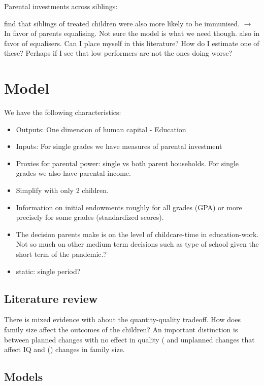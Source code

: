 \documentclass[11pt,a4paper,twoside]{article}
\begin{document}
Parental investments across siblings:

\cite{adhvaryu_endowments_2016} find that siblings of treated children were also more likely to be immunised. $\rightarrow$ In favor of parents equalising. Not sure the model is what we need though. \cite{yi_early_2015} also in favor of equalisers. Can I place myself in this literature? How do I estimate one of these? Perhaps if I see that low performers are not the ones doing worse?

\section{Model}

We have the following characteristics:

\begin{itemize}
    \item Outputs: One dimension of human capital - Education
    \item Inputs: For single grades we have measures of parental investment
    \item Proxies for parental power: single vs both parent households. For single grades we also have parental income.
    \item Simplify with only 2 children.
    \item Information on initial endowments roughly for all grades (GPA) or more precisely for some grades (standardized scores).
    \item The decision parents make is on the level of childcare-time in education-work. Not so much on other medium term decisions such as type of school given the short term of the pandemic.?
    \item static: single period?
\end{itemize}


\subsection{Literature review}

There is mixed evidence with about the quantity-quality tradeoff. How does family size affect the outcomes of the children? An important distinction is between planned changes with no effect in quality (\cite{black_more_2005} and unplanned changes that affect IQ and  (\cite{black_small_2010}) changes in family size. 



\subsection{Models}
\end{document}
